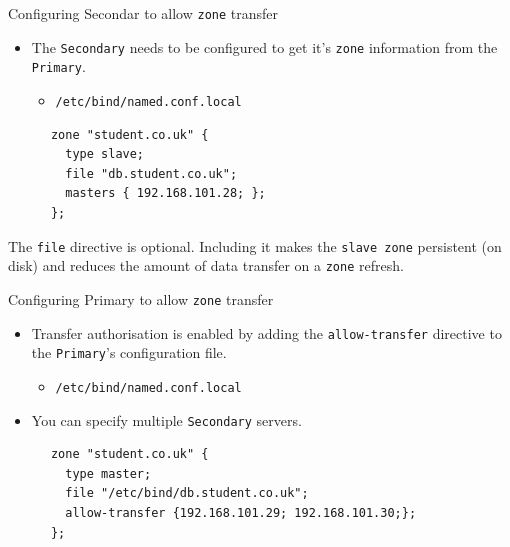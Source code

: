 \documentclass[xcolor=table,aspectratio=169]{beamer}
\begin{document}
\begin{frame}[fragile]{Configuring Secondar to allow \texttt{zone} transfer}
  \begin{itemize}
    \item The \texttt{Secondary} needs to be configured to get it's \texttt{zone} information from the \texttt{Primary}.
      \begin{itemize}
        \item \texttt{/etc/bind/named.conf.local}
      \end{itemize}
  \end{itemize}
  \begin{tcolorbox}
    \lstset{
      basicstyle=\tiny\ttfamily,
    }
    \begin{lstlisting}
      zone "student.co.uk" {
        type slave;
        file "db.student.co.uk";
        masters { 192.168.101.28; };
      };    
    \end{lstlisting}
  \end{tcolorbox}
  \begin{tcolorbox}[title={\textbf{NOTE:}}]
    \begin{center}
      \scriptsize The \texttt{file} directive is optional. Including it makes the \texttt{slave zone} persistent (on disk) and reduces the amount of data 
      transfer on a \texttt{zone} refresh.
    \end{center}
  \end{tcolorbox}
\end{frame}

\begin{frame}[fragile]{Configuring Primary to allow \texttt{zone} transfer}
  \begin{itemize}
    \item Transfer authorisation is enabled by adding the \texttt{allow-transfer} directive to the \texttt{Primary}'s configuration file.
      \begin{itemize}
        \item \texttt{/etc/bind/named.conf.local}
      \end{itemize}
    \item You can specify multiple \texttt{Secondary} servers.
  \end{itemize}
  \begin{tcolorbox}
    \lstset{
      basicstyle=\tiny\ttfamily,
    }
    \begin{lstlisting}
      zone "student.co.uk" {
        type master;
        file "/etc/bind/db.student.co.uk";
        allow-transfer {192.168.101.29; 192.168.101.30;};
      };          
    \end{lstlisting}
  \end{tcolorbox}
\end{frame}
\end{document}
